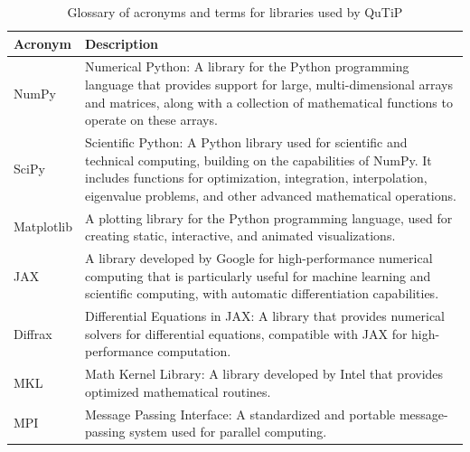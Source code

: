 \documentclass[preprint,3p,sort&compress]{elsarticle}
\begin{document}
\begin{table}[ht]
    \centering
         \renewcommand{\arraystretch}{1.3} 
    \begin{tabular}{@{}lp{12cm}@{}}
        \toprule
        \textbf{Acronym} & \textbf{Description} \\
        \midrule
        NumPy & Numerical Python: A library for the Python programming language that provides support for large, multi-dimensional arrays and matrices, along with a collection of mathematical functions to operate on these arrays. \\
      
        SciPy & Scientific Python: A Python library used for scientific and technical computing, building on the capabilities of NumPy. It includes functions for optimization, integration, interpolation, eigenvalue problems, and other advanced mathematical operations. \\
 
        Matplotlib & A plotting library for the Python programming language, used for creating static, interactive, and animated visualizations. \\
   
        JAX & A library developed by Google for high-performance numerical computing that is particularly useful for machine learning and scientific computing, with automatic differentiation capabilities. \\
  
        Diffrax & Differential Equations in JAX: A library that provides numerical solvers for differential equations, compatible with JAX for high-performance computation. \\
   
        MKL & Math Kernel Library: A library developed by Intel that provides optimized mathematical routines. \\
  
        MPI & Message Passing Interface: A standardized and portable message-passing system used for parallel computing. \\
\bottomrule
    \end{tabular}
    \caption{Glossary of acronyms and terms for libraries used by QuTiP}
    \label{tab:glossary_acronyms}
\end{table}
\end{document}
